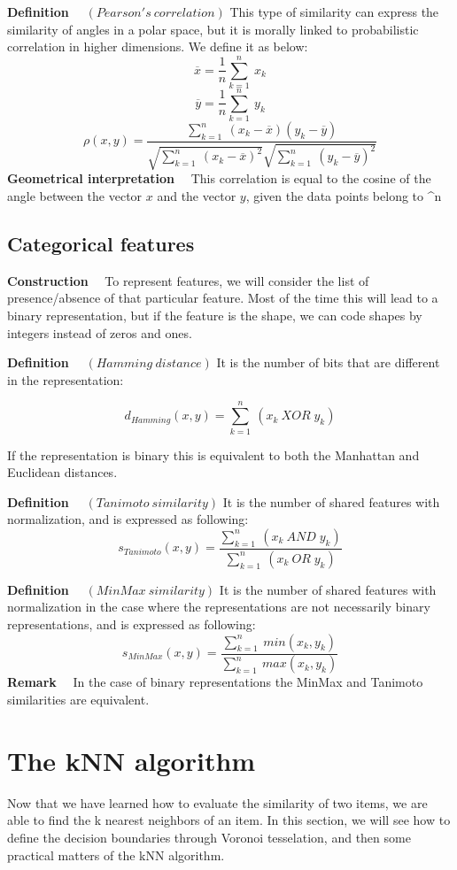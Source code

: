 \documentclass[a4paper,12pt]{article}
\begin{document}
\textbf{Definition}$\quad$ $(Pearson's\: correlation)$ This type of similarity can express the similarity of angles in a polar space, but it is morally linked to probabilistic correlation in higher dimensions. We define it as below:
$$ \overline{x} = \frac{1}{n} \sum^n_{k=1}\:x_{k} $$
$$ \overline{y} = \frac{1}{n} \sum^n_{k=1}\:y_{k} $$
$$ \rho (x,y) = \frac{\sum^n_{k=1}\:(x_{k}-\overline{x})(y_{k}-\overline{y})}{\sqrt{\sum^n_{k=1}\:(x_{k}-\overline{x})^2}\sqrt{\sum^n_{k=1}\:(y_{k}-\overline{y})^2}} $$
\textbf{Geometrical interpretation}$\quad$ This correlation is equal to the cosine of the angle between the vector $x$ and the vector $y$, given the data points belong to ^n

\subsection{Categorical features}


\textbf{Construction}$\quad$ To represent features, we will consider the list of presence/absence of that particular feature. Most of the time this will lead to a binary representation, but if the feature is the shape, we can code shapes by integers instead of zeros and ones.


\textbf{Definition}$\quad$ $(Hamming\: distance)$ It is the number of bits that are different in the representation:

$$ d_{Hamming}(x,y) = \sum^n_{k=1}\:(x_{k}\:XOR\; y_{k}) $$

	If the representation is binary this is equivalent to both the Manhattan and Euclidean distances.
	

\textbf{Definition}$\quad$ $(Tanimoto\: similarity)$ It is the number of shared features with normalization, and is expressed as following:
$$ s_{Tanimoto} (x,y) = \frac{\sum^n_{k=1}\:(x_{k} \:AND\; y_{k})}{\sum^n_{k=1}\:(x_{k} \:OR\; y_{k})} $$

\textbf{Definition}$\quad$ $(MinMax\: similarity)$ It is the number of shared features with normalization in the case where the representations are not necessarily binary representations, and is expressed as following:
$$ s_{MinMax} (x,y) = \frac{\sum^n_{k=1}\:min(x_{k}, y_{k})}{\sum^n_{k=1}\:max(x_{k}, y_{k})} $$
\textbf{Remark}$\quad$ In the case of binary representations the MinMax and Tanimoto similarities are equivalent.


\section{The kNN algorithm}
Now that we have learned how to evaluate the similarity of two items, we are able to find the k nearest neighbors of an item. In this section, we will see how to define the decision boundaries through Voronoi tesselation, and then some practical matters of the kNN algorithm.
\end{document}
